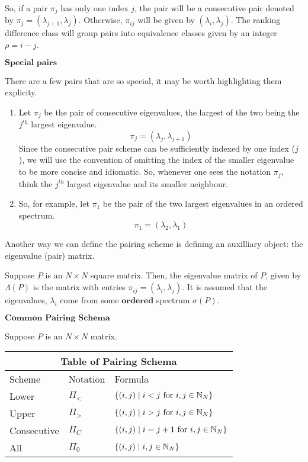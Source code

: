 So, if a pair $\pi_j$ has only one index $j$, the pair will be a consecutive pair denoted by $\pi_j = (\lambda_{j+1}, \lambda_j)$. Otherwise, $\pi_{ij}$ will be given by $(\lambda_{i}, \lambda_j)$. The ranking difference class will group pairs into equivalence classes given by an integer $\rho = i - j$.

\begin{center}
$\textbf{Special pairs}$
\end{center}

There are a few pairs that are so special, it may be worth highlighting them explicity.

\begin{enumerate}
  \item Let $\pi_j$ be the pair of consecutive eigenvalues, the largest of the two being the $j^{th}$ largest eigenvalue.
  $${\pi}_j = (\lambda_j,\lambda_{j+1})$$
  Since the consecutive pair scheme can be sufficiently indexed by one index ($j$), we will use the convention of omitting the index of the smaller eigenvalue to be more concise and idiomatic. So, whenever one sees the notation $\pi_j$, think the $j^{th}$ largest eigenvalue and its smaller neighbour.
  \item So, for example, let $\pi_1$ be the pair of the two largest eigenvalues in an ordered spectrum. 
  $$\pi_1 = (\lambda_2,\lambda_1)$$
\end{enumerate}

Another way we can define the pairing scheme is defining an auxilliary object: the eigenvalue (pair) matrix.

\begin{definition}
Suppose $P$ is an $N \times N$ square matrix. Then, the eigenvalue matrix of $P$, given by $\Lambda(P)$ is the matrix with entries $\pi_{ij} = (\lambda_i, \lambda_j)$. It is assumed that the eigenvalues, $\lambda_i$ come from some $\textbf{ordered}$ spectrum $\sigma(P)$.
\end{definition}

\begin{center}
$\textbf{Common Pairing Schema}$
\end{center}

Suppose $P$ is an $N \times N$ matrix. \newline

\begin{tabular}{ |p{2.5cm}||p{1.75cm}|p{5.5cm}|  }
 \hline
 \multicolumn{3}{|c|}{Table of Pairing Schema} \\
 \hline
 Scheme & Notation & Formula \\
 \hline
 Lower & $\Pi_<$ & $\{(i,j) \mid i < j \text{ for } i,j \in \mathbb{N}_N \}$ \\
 Upper  & $\Pi_>$ & $\{(i,j) \mid i > j \text{ for } i,j \in \mathbb{N}_N \}$ \\
 Consecutive  & $\Pi_C$ & $\{(i,j) \mid i = j + 1 \text{ for } i,j \in \mathbb{N}_N \}$ \\
 All & $\Pi_0$ & $\{(i,j) \mid i,j \in \mathbb{N}_N \}$ \\
 \hline
\end{tabular}

